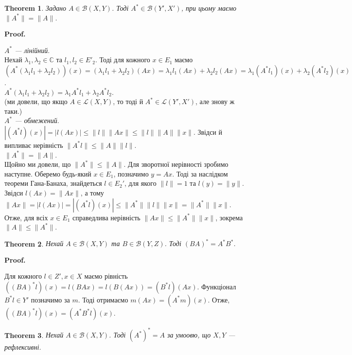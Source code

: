 \documentclass[a4paper, 10pt]{article}
\makeatletter
\theoremstyle{theoremdd}
\newtheorem{theorem}{Theorem}[subsection]
\theoremstyle{theoremdd}
\theoremstyle{theoremdd}
\theoremstyle{theoremdd}
\theoremstyle{theoremdd}
\theoremstyle{theoremdd}
\theoremstyle{theoremdd}
\theoremstyle{theoremdd}
\renewenvironment{proof}[1][Proof.\\]{\par
\pushQED{\hfill \qed}%
\normalfont \topsep6\p@\@plus6\p@\relax
\trivlist
\item\relax
{\bfseries
#1\@addpunct{.}}\hspace\labelsep\ignorespaces
}{%
\popQED\endtrivlist\@endpefalse
}
\makeatother
\begin{document}
\begin{theorem}
Задано $A \in \mathcal{B}(X,Y)$. Тоді $A^* \in \mathcal{B}(Y',X')$, при цьому маємо $\|A^*\| = \|A\|$.
\end{theorem}

\begin{proof}
\textit{$A^*$ --- лінійний}.\\
Нехай $\lambda_1,\lambda_2 \in \mathbb{C}$ та $l_1,l_2 \in E'_2$. Тоді для кожного $x \in E_1$ маємо\\
$(A^*(\lambda_1 l_1 + \lambda_2 l_2))(x) = (\lambda_1 l_1 + \lambda_2 l_2)(Ax) = \lambda_1 l_1 (Ax) + \lambda_2 l_2 (Ax) = \lambda_1 (A^*l_1)(x) + \lambda_2 (A^*l_2)(x)$.\\
$A^*(\lambda_1 l_1 + \lambda_2 l_2) = \lambda_1 A^* l_1 + \lambda_2 A^* l_2$.\\
(ми довели, що якщо $A \in \mathcal{L}(X,Y)$, то тоді й $A^* \in \mathcal{L}(Y',X')$, але знову ж таки.)
\bigskip \\
\textit{$A^*$ --- обмежений}.\\
$|(A^*l)(x)| = |l(Ax)| \leq \|l\| \|Ax\| \leq \|l\| \|A\| \|x\|$. Звідси й випливає нерівність $\|A^*l\| \leq \|A\| \|l\|$.
\bigskip \\
\textit{$\|A^*\| = \|A\|$}.\\
Щойно ми довели, що $\|A^*\| \leq \|A\|$. Для зворотної нерівності зробимо наступне. Оберемо будь-який $x \in E_1$, позначимо $y = Ax$. Тоді за наслідком теореми Гана-Банаха, знайдеться $l \in E_2'$, для якого $\|l\| = 1$ та $l(y) = \|y\|$. Звідси $l(Ax) = \|Ax\|$, а тому $\|Ax\| = |l(Ax)| = |(A^*l)(x)| \leq \|A^*\| \|l\| \|x\| = \|A^*\| \|x\|$. Отже, для всіх $x \in E_1$ справедлива нерівність $\|Ax\| \leq \|A^*\| \|x\|$, зокрема $\|A\| \leq \|A^*\|$.
\end{proof}

\begin{theorem}
Нехай $A \in \mathcal{B}(X,Y)$ та $B \in \mathcal{B}(Y,Z)$. Тоді $(BA)^* = A^*B^*$.
\end{theorem}

\begin{proof}
Для кожного $l \in Z',x \in X$ маємо рівність $((BA)^*l)(x) = l(BAx) = l(B(Ax)) = (B^*l)(Ax)$. Функціонал $B^*l \in Y'$ позначимо за $m$. Тоді отримаємо $m(Ax) = (A^*m)(x)$. Отже, \\ $((BA)^*l)(x) = (A^*B^*l)(x)$.
\end{proof}

\begin{theorem}
Нехай $A \in \mathcal{B}(X,Y)$. Тоді $(A^*)^* = A$ за умоовю, що $X,Y$ --- рефлексивні.
\end{theorem}
\end{document}
